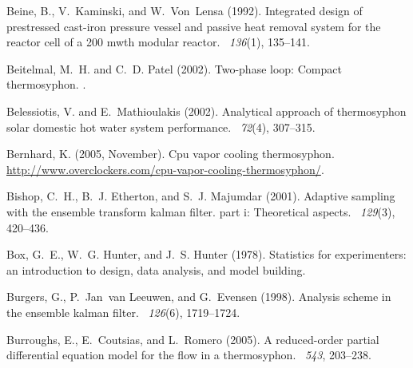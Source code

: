 \documentclass[12pt]{report}
\begin{document}
\begin{thebibliography}{}
Beine, B., V.~Kaminski, and W.~Von~Lensa (1992).
\newblock Integrated design of prestressed cast-iron pressure vessel and
  passive heat removal system for the reactor cell of a 200 mwth modular
  reactor.
~{\em 136\/}(1), 135--141.

Beitelmal, M.~H. and C.~D. Patel (2002).
\newblock Two-phase loop: Compact thermosyphon.
.

Belessiotis, V. and E.~Mathioulakis (2002).
\newblock Analytical approach of thermosyphon solar domestic hot water system
  performance.
~{\em 72\/}(4), 307--315.

Bernhard, K. (2005, November).
\newblock Cpu vapor cooling thermosyphon.
\newblock \url{http://www.overclockers.com/cpu-vapor-cooling-thermosyphon/}.

Bishop, C.~H., B.~J. Etherton, and S.~J. Majumdar (2001).
\newblock Adaptive sampling with the ensemble transform kalman filter. part i:
  Theoretical aspects.
~{\em 129\/}(3), 420--436.

Box, G.~E., W.~G. Hunter, and J.~S. Hunter (1978).
\newblock Statistics for experimenters: an introduction to design, data
  analysis, and model building.

Burgers, G., P.~Jan~van Leeuwen, and G.~Evensen (1998).
\newblock Analysis scheme in the ensemble kalman filter.
~{\em 126\/}(6), 1719--1724.

Burroughs, E., E.~Coutsias, and L.~Romero (2005).
\newblock A reduced-order partial differential equation model for the flow in a
  thermosyphon.
~{\em 543}, 203--238.


\end{thebibliography}
\end{document}
